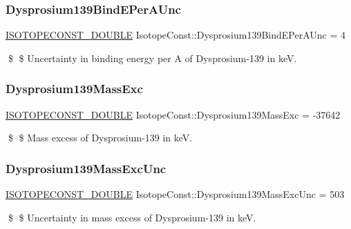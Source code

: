 \subsubsection{\texorpdfstring{Dysprosium139\+Bind\+E\+Per\+A\+Unc}{Dysprosium139BindEPerAUnc}}
{\footnotesize\ttfamily \mbox{\hyperlink{group___isotope_const-_macros_ga8f45a7272ce02c0b4c65c44636ed719a}{I\+S\+O\+T\+O\+P\+E\+C\+O\+N\+S\+T\+\_\+\+D\+O\+U\+B\+LE}} Isotope\+Const\+::\+Dysprosium139\+Bind\+E\+Per\+A\+Unc = 4}

\$ \$ Uncertainty in binding energy per A of Dysprosium-\/139 in keV. \mbox{\label{group___isotope_const-_dysprosium-_dy139_ga20c8bb65b61d75be4d832a4fd6b4dcc6}} 
\subsubsection{\texorpdfstring{Dysprosium139\+Mass\+Exc}{Dysprosium139MassExc}}
{\footnotesize\ttfamily \mbox{\hyperlink{group___isotope_const-_macros_ga8f45a7272ce02c0b4c65c44636ed719a}{I\+S\+O\+T\+O\+P\+E\+C\+O\+N\+S\+T\+\_\+\+D\+O\+U\+B\+LE}} Isotope\+Const\+::\+Dysprosium139\+Mass\+Exc = -\/37642}

\$ \$ Mass excess of Dysprosium-\/139 in keV. \mbox{\label{group___isotope_const-_dysprosium-_dy139_ga0b91c34056ac8bc3ec1da92531d512a7}} 
\subsubsection{\texorpdfstring{Dysprosium139\+Mass\+Exc\+Unc}{Dysprosium139MassExcUnc}}
{\footnotesize\ttfamily \mbox{\hyperlink{group___isotope_const-_macros_ga8f45a7272ce02c0b4c65c44636ed719a}{I\+S\+O\+T\+O\+P\+E\+C\+O\+N\+S\+T\+\_\+\+D\+O\+U\+B\+LE}} Isotope\+Const\+::\+Dysprosium139\+Mass\+Exc\+Unc = 503}

\$ \$ Uncertainty in mass excess of Dysprosium-\/139 in keV. \mbox{\label{group___isotope_const-_dysprosium-_dy139_ga0f202c11b3abc1be556b79245ea09ca0}} 
